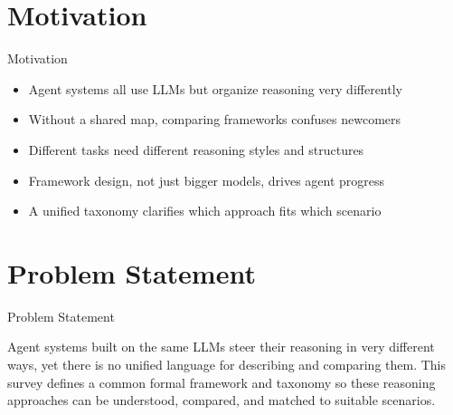 \documentclass[10pt]{beamer}
\begin{document}
\section{Motivation}
\begin{frame}{Motivation}
\begin{itemize}
  \item Agent systems all use LLMs but organize reasoning very differently
  \item Without a shared map, comparing frameworks confuses newcomers
  \item Different tasks need different reasoning styles and structures
  \item Framework design, not just bigger models, drives agent progress
  \item A unified taxonomy clarifies which approach fits which scenario
\end{itemize}
\end{frame}
\section{Problem Statement}
\begin{frame}{Problem Statement}
  \begin{block}{}
  Agent systems built on the same LLMs steer their reasoning in very different ways, yet there is no unified language for describing and comparing them. This survey defines a common formal framework and taxonomy so these reasoning approaches can be understood, compared, and matched to suitable scenarios.
  \end{block}
\end{frame}
\end{document}
